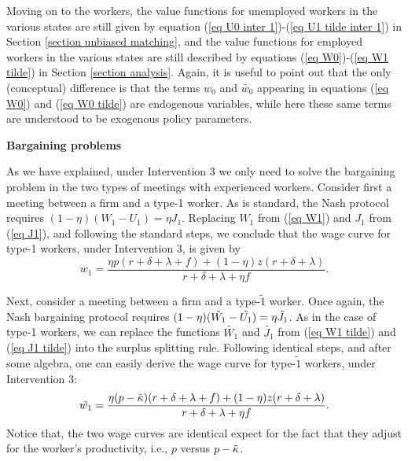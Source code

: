 \documentclass[12pt]{article} %
\theoremstyle{definition}
\begin{document}
Moving on to the workers, the value functions for unemployed workers in the various states are still given by equation (\ref{eq U0 inter 1})-(\ref{eq U1 tilde inter 1}) in Section \ref{section unbiased matching}, and the value functions for employed workers in the various states are still described by equations (\ref{eq W0})-(\ref{eq W1 tilde}) in Section \ref{section analysis}. Again, it is useful to point out that the only (conceptual) difference is that the terms $w_0$ and $\tilde{w_0}$ appearing in equations (\ref{eq W0}) and (\ref{eq W0 tilde}) are endogenous variables, while here these same terms are understood to be exogenous policy parameters.  


\bigskip 

\noindent \textbf{Bargaining problems}

\noindent As we have explained, under Intervention 3 we only need to solve the bargaining problem in the two types of meetings with experienced workers. Consider first a meeting between a firm and a type-1 worker. As is standard, the Nash protocol requires $(1-\eta)(W_1-U_1) = \eta J_1$. Replacing $W_1$ from (\ref{eq W1}) and $J_1$ from (\ref{eq J1}), and following the standard steps, we conclude that the wage curve for type-1 workers, under Intervention 3, is given by
\begin{equation}
 w_1 = \frac{\eta p (r+\delta+\lambda+f)+(1-\eta)z(r+\delta+\lambda)}{r+\delta+\lambda + \eta f}.\label{eq wage curve 1 inter 3}    
\end{equation}

Next, consider a meeting between a firm and a type-$\tilde{1}$ worker. Once again, the Nash bargaining protocol requires $(1-\eta)(\Tilde{W_1}-\Tilde{U_1}) = \eta \Tilde{J_1}$. As in the case of type-1 workers, we can replace the functions $\tilde{W_1}$ and $\tilde{J_1}$ from (\ref{eq W1 tilde}) and (\ref{eq J1 tilde}) into the surplus splitting rule. Following identical steps, and after some algebra, one can easily derive the wage curve for type-$\tilde{1}$ workers, under Intervention 3: 
\begin{equation}
\Tilde{w_1} = \frac{\eta (p-\Tilde{\kappa}) (r+\delta+\lambda+f)+(1-\eta)z(r+\delta+\lambda)}{r+\delta +\lambda+ \eta f}.\label{eq wage curve 1 tilde inter 3}
\end{equation}Notice that, the two wage curves are identical expect for the fact that they adjust for the worker's productivity, i.e., $p$ versus $p-\Tilde{\kappa}$. 

\bigskip 
\end{document}
